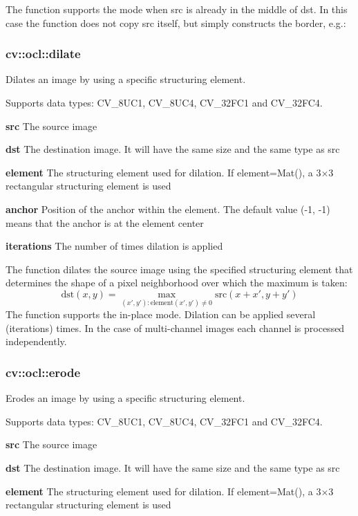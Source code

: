 \documentclass{article}
\begin{document}
The function supports the mode when src is already in the middle of dst. In
this case the function does not copy src itself, but simply constructs the
border, e.g.:

\newpage

\subsubsection{cv::ocl::dilate }
\label{subsubsec:mylabel35}
Dilates an image by using a specific structuring element.

Supports data types: CV{\_}8UC1, CV{\_}8UC4, CV{\_}32FC1 and CV{\_}32FC4.

\textbf{src }The source image

\textbf{dst }The destination image. It will have the same size and the same
type as src

\textbf{element }The structuring element used for dilation. If
element=Mat(), a 3$\times $3 rectangular structuring element is used

\textbf{anchor }Position of the anchor within the element. The default value
(-1, -1) means that the anchor is at the element center

\textbf{iterations }The number of times dilation is applied

The function dilates the source image using the specified structuring
element that determines the shape of a pixel neighborhood over which the
maximum is taken:
\[
\mbox{dst}(x,y)=\mathop {\max
}\limits_{({x}',{y}'):\mbox{element}({x}',{y}')\ne 0}
\mbox{src}(x+{x}',y+{y}')
\]
The function supports the in-place mode. Dilation can be applied several
(iterations) times. In the case of multi-channel images each channel is
processed independently.

\newpage

\subsubsection{cv::ocl::erode}
\label{subsubsec:mylabel36}
Erodes an image by using a specific structuring element.

Supports data types: CV{\_}8UC1, CV{\_}8UC4, CV{\_}32FC1 and CV{\_}32FC4.

\textbf{src }The source image

\textbf{dst }The destination image. It will have the same size and the same
type as src

\textbf{element }The structuring element used for dilation. If
element=Mat(), a 3$\times $3 rectangular structuring element is used
\end{document}
